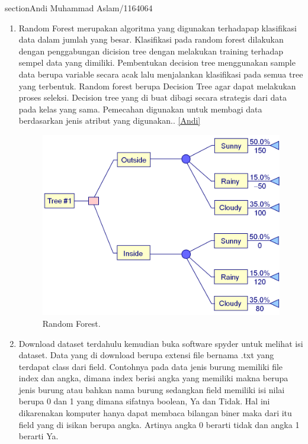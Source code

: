 section{Andi Muhammad Aslam/1164064}
\begin{enumerate}

\item Random Forest merupakan algoritma yang digunakan terhadapap klasifikasi data dalam jumlah yang besar. Klasifikasi pada random forest dilakukan dengan penggabungan dicision tree dengan melakukan training terhadap sempel data yang dimiliki. Pembentukan decision tree menggunakan sample data berupa variable secara acak lalu menjalankan klasifikasi pada semua tree yang terbentuk. Random forest berupa Decision Tree agar dapat melakukan proses seleksi. Decision tree yang di buat dibagi secara strategis dari data pada kelas yang sama. Pemecahan digunakan untuk membagi data berdasarkan jenis atribut yang digunakan..  \ref{Andi}

\begin{figure}[ht]
	\centerline{\includegraphics[width=1\textwidth]{figures/andi/decision tree.jpg}}
	\caption{Random Forest.}
	\label{contoh}
	\end{figure}

\item Download dataset terdahulu kemudian buka software spyder untuk melihat isi dataset. Data yang di download berupa extensi file bernama .txt yang terdapat class dari field. Contohnya pada data jenis burung memiliki file index dan angka, dimana index berisi angka yang memiliki makna berupa jenis burung atau bahkan nama burung sedangkan field memiliki isi nilai berupa 0 dan 1 yang dimana sifatnya boolean, Ya dan Tidak. Hal ini dikarenakan komputer hanya dapat membaca bilangan biner maka dari itu field yang di isikan berupa angka. Artinya angka 0 berarti tidak dan angka 1 berarti Ya.


\end{enumerate}
